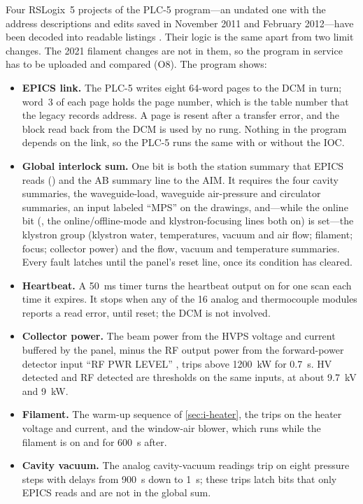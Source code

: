 Four RSLogix~5 projects of the PLC-5 program---an undated one with the address
descriptions and edits saved in November 2011 and February 2012---have been decoded
into readable listings . Their logic is the same apart from two limit changes.
The 2021 filament changes are not in them, so the program in service has to be
uploaded and compared (O8). The program shows:
\begin{itemize}
\item \textbf{EPICS link.} The PLC-5 writes eight 64-word pages to the DCM in turn;
word~3 of each page holds the page number, which is the table number that the legacy
records address. A page is resent after a transfer error, and the block read back from
the DCM is used by no rung. Nothing in the program depends on the link, so the PLC-5
runs the same with or without the IOC.
\item \textbf{Global interlock sum.} One bit is both the station summary that EPICS
reads () and the AB summary line to the AIM. It requires the
four cavity summaries, the waveguide-load, waveguide air-pressure and circulator
summaries, an input labeled ``MPS'' on the drawings, and---while the online bit
(, the online/offline-mode and klystron-focusing lines both
on) is set---the klystron group (klystron water, temperatures, vacuum and air flow;
filament; focus; collector power) and the flow, vacuum and temperature summaries.
Every fault latches until the panel's reset line, once its condition has cleared.
\item \textbf{Heartbeat.} A \qty{50}{\milli\second} timer turns the heartbeat output
on for one scan each time it expires. It stops when any of the 16 analog and
thermocouple modules reports a read error, until reset; the DCM is not involved.
\item \textbf{Collector power.} The beam power from the HVPS voltage and current
buffered by the panel, minus the RF output power from the forward-power detector input
``RF PWR LEVEL'' , trips above \qty{1200}{\kilo\watt} for
\qty{0.7}{\second}. HV detected and RF detected are thresholds on the same inputs, at
about \qty{9.7}{\kilo\volt} and \qty{9}{\kilo\watt}.
\item \textbf{Filament.} The warm-up sequence of \cref{sec:i-heater}, the trips on the
heater voltage and current, and the window-air blower, which runs while the filament
is on and for \qty{600}{\second} after.
\item \textbf{Cavity vacuum.} The analog cavity-vacuum readings trip on eight
pressure steps with delays from \qty{900}{\second} down to \qty{1}{\second}; these
trips latch bits that only EPICS reads and are not in the global sum.
\end{itemize}

